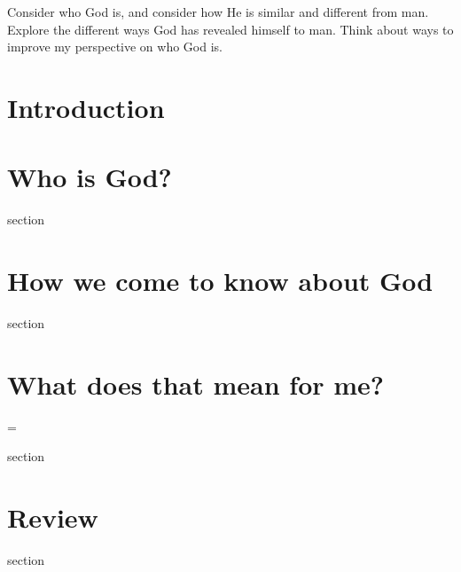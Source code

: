 
\begin{goals}
\goal Consider who God is, and consider how He is similar and different from man.
\goal Explore the different ways God has revealed himself to man.
\goal Think about ways to improve my perspective on who God is.
\end{goals}

\section*{Introduction}
\begin{frame}
\keyversehiglight{\insertshortlecture}
\end{frame}
\section{Who is God?}
\begin{frame}
section
\end{frame}
\section{How we come to know about God}
\begin{frame}
section
\end{frame}
\section{What does that mean for me?}=
\begin{frame}
section
\end{frame}
\section*{Review}
\begin{frame}
section
\end{frame}

